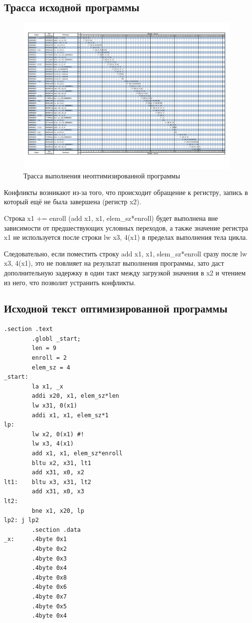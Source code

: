 \documentclass{article}
\begin{document}
\clearpage\subsection{Трасса исходной программы}
\begin{figure}[h]
	\centering
	\includegraphics[scale=0.4]{tools/line.pdf}
          \caption{Трасса выполнения неоптимизированной программы}
\end{figure}

Конфликты возникают из-за того, что происходит обращение к регистру, запись в который ещё не была завершена (регистр x2).

Cтрока x1 += enroll (add x1, x1, elem\_sz*enroll) будет выполнена вне зависимости от предшествующих условных переходов, а 
также значение регистра x1 не используется после строки lw x3, 4(x1) в пределах выполнения тела цикла.

Следовательно, если поместить строку add x1, x1, slem\_sz*enroll сразу после lw x3, 4(x1), это не повлияет на результат 
выполнения программы, зато даст дополнительную задержку в один такт между загрузкой значения в x2 и чтением из него, что 
позволит устранить конфликты.

\clearpage\subsection{Исходной текст оптимизированной программы}
\begin{lstlisting}[style=lst, caption=Исходный текст оптимизированной программы]
.section .text
        .globl _start;
        len = 9
        enroll = 2
        elem_sz = 4 
_start:
        la x1, _x
        addi x20, x1, elem_sz*len
        lw x31, 0(x1)
        addi x1, x1, elem_sz*1
lp:
        lw x2, 0(x1) #!
        lw x3, 4(x1)
        add x1, x1, elem_sz*enroll
        bltu x2, x31, lt1
        add x31, x0, x2
lt1:    bltu x3, x31, lt2
        add x31, x0, x3
lt2:
        bne x1, x20, lp
lp2: j lp2
        .section .data
_x:     .4byte 0x1
        .4byte 0x2
        .4byte 0x3
        .4byte 0x4
        .4byte 0x8
        .4byte 0x6
        .4byte 0x7
        .4byte 0x5
        .4byte 0x4
\end{lstlisting}
\end{document}
